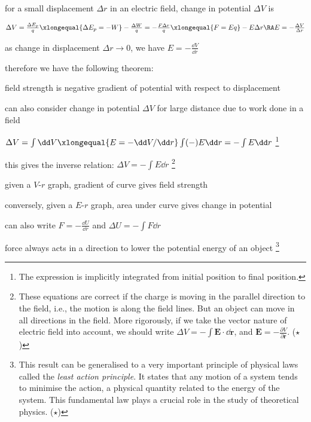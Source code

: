 for a small displacement $\Delta r$ in an electric field, change in potential $\Delta V$ is

{

\centering

$\Delta V = \frac{\Delta E_p}{q} \xlongequal{\Delta E_p=-W} - \frac{\Delta W}{q} = - \frac{F \Delta r}{q} \xlongequal{F=Eq} - E \Delta r \RA E = - \frac{\Delta V}{\Delta r}$

}

\eqyskip as change in displacement $\Delta r \to 0$, we have $\boxed{E = - \frac{\dd V}{\dd r}}$

therefore we have the following theorem:

\begin{ilight}
	\centering field strength is negative gradient of potential with respect to displacement
\end{ilight}

\newpage

can also consider change in potential $\Delta V$ for large distance due to work done in a field

{
	
\centering

$\Delta V= \int \dd V \xlongequal{E = -\dd V/\dd r}  \int (-)E \dd r =  -\int E \dd r$
\footnote{The expression is implicitly integrated from initial position to final position.}

}

\eqyskip this gives the inverse relation: $\boxed{\Delta V = -\int E \dd r}$
\footnote{These equations are correct if the charge is moving in the parallel direction to the field, i.e., the motion is along the field lines. But an object can move in all directions in the field. More rigorously, if we take the vector nature of electric field into account, we should write $\Delta V = - \int \mathbf{E}\cdot\dd\mathbf{r}$, and $\mathbf{E} = - \frac{\partial V}{\partial \mathbf{r}}$. ($\star$)}

\cmt given a $V$-$r$ graph, gradient of curve gives field strength

conversely, given a $E$-$r$ graph, area under curve gives change in potential

\cmt can also write $F = - \frac{\dd U}{\dd r}$ and $\Delta U = -\int F \dd r$

force always acts in a direction to lower the potential energy of an object
\footnote{This result can be generalised to a very important principle of physical laws called the \emph{least action principle}. It states that any motion of a system tends to minimise the action, a physical quantity related to the energy of the system. This fundamental law plays a crucial role in the study of theoretical physics. ($\star$)}

